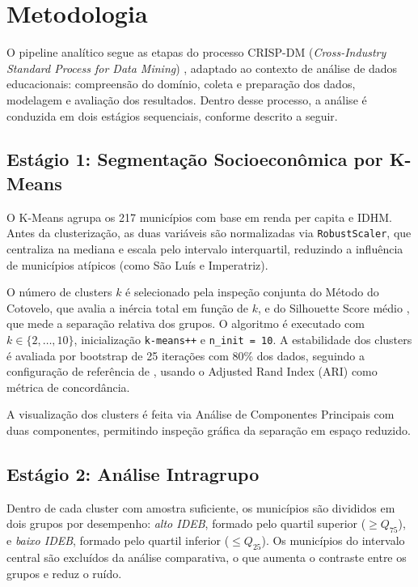 \section{Metodologia}

O pipeline analítico segue as etapas do processo CRISP-DM (\textit{Cross-Industry Standard Process for Data Mining}) \cite{shearer2000}, adaptado ao contexto de análise de dados educacionais: compreensão do domínio, coleta e preparação dos dados, modelagem e avaliação dos resultados. Dentro desse processo, a análise é conduzida em dois estágios sequenciais, conforme descrito a seguir.

\subsection{Estágio 1: Segmentação Socioeconômica por K-Means}

O K-Means \cite{macqueen1967} agrupa os 217 municípios com base em renda per capita e IDHM. Antes da clusterização, as duas variáveis são normalizadas via \texttt{RobustScaler}, que centraliza na mediana e escala pelo intervalo interquartil, reduzindo a influência de municípios atípicos (como São Luís e Imperatriz).

O número de clusters $k$ é selecionado pela inspeção conjunta do Método do Cotovelo, que avalia a inércia total em função de $k$, e do Silhouette Score médio \cite{rousseeuw1987}, que mede a separação relativa dos grupos. O algoritmo é executado com $k \in \{2, \ldots, 10\}$, inicialização \texttt{k-means++} e \texttt{n\_init = 10}. A estabilidade dos clusters é avaliada por bootstrap de 25 iterações com 80\% dos dados, seguindo a configuração de referência de \citet{benhur2002}, usando o Adjusted Rand Index (ARI) como métrica de concordância.

A visualização dos clusters é feita via Análise de Componentes Principais \cite{abdi2010} com duas componentes, permitindo inspeção gráfica da separação em espaço reduzido.

\subsection{Estágio 2: Análise Intragrupo}

Dentro de cada cluster com amostra suficiente, os municípios são divididos em dois grupos por desempenho: \textit{alto IDEB}, formado pelo quartil superior ($\geq Q_{75}$), e \textit{baixo IDEB}, formado pelo quartil inferior ($\leq Q_{25}$). Os municípios do intervalo central são excluídos da análise comparativa, o que aumenta o contraste entre os grupos e reduz o ruído.

